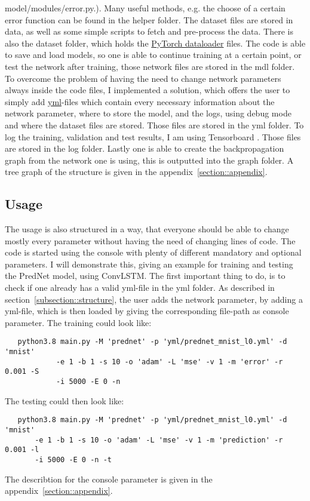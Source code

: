   model/modules/error.py.). Many useful methods, e.g. the choose of a certain error function can be found in the helper folder. The dataset files are stored in 
  data, as well as some simple scripts to fetch and pre-process the data. There is also the dataset folder, which holds the \href{https://pytorch.org/docs/stable/
  data.html}{PyTorch dataloader} files. The code is able to save and load models, so one is able to continue training at a certain point, or test the network
  after training, those network files are stored in the mdl folder. To overcome the problem of having the need to change network parameters always inside the
  code files, I implemented a solution, which offers the user to simply add \href{https://yaml.org/}{yml}-files which contain every necessary information about 
  the network parameter, where to store the model, and the logs, using debug mode and where the dataset files are stored. Those files are stored in the yml 
  folder. To log the training, validation and test results, I am using Tensorboard \cite{tensorflow2015}. Those files are stored in the log folder.
  Lastly one is able to create the backpropagation graph from the network one is using, this is outputted into the graph folder.
  A tree graph of the structure is given in the appendix~\ref{section::appendix}.
  
 \subsection{Usage}
  The usage is also structured in a way, that everyone should be able to change mostly every parameter without having the need of changing lines of code.
  The code is started using the console with plenty of different mandatory and optional parameters. I will demonstrate this, giving an example for
  training and testing the PredNet model, using ConvLSTM. The first important thing to do, is to check if one already has a valid yml-file in the yml folder.
  As described in section~\ref{subsection::structure}, the user adds the network parameter, by adding a yml-file, which is then loaded by giving the corresponding 
  file-path as console parameter.
  The training could look like:
  \begin{lstlisting}
   python3.8 main.py -M 'prednet' -p 'yml/prednet_mnist_l0.yml' -d 'mnist'
            -e 1 -b 1 -s 10 -o 'adam' -L 'mse' -v 1 -m 'error' -r 0.001 -S
            -i 5000 -E 0 -n
  \end{lstlisting} \noindent
  The testing could then look like:
  \begin{lstlisting}
   python3.8 main.py -M 'prednet' -p 'yml/prednet_mnist_l0.yml' -d 'mnist'
       -e 1 -b 1 -s 10 -o 'adam' -L 'mse' -v 1 -m 'prediction' -r 0.001 -l
       -i 5000 -E 0 -n -t
  \end{lstlisting}
  The describtion for the console parameter is given in the appendix~\ref{section::appendix}.

